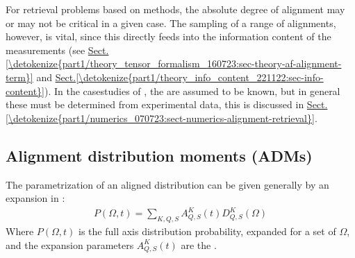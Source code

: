 \documentclass[letterpaper,table,10pt,english]{jupyterBook}
\begin{document}
\sphinxAtStartPar
For {\hyperref[\detokenize{backmatter/glossary:term-radial-matrix-elements}]{}} retrieval problems based on {\hyperref[\detokenize{backmatter/glossary:term-RWP}]{}} methods, the absolute degree of alignment may \sphinxhyphen{} or may not \sphinxhyphen{} be critical in a given case. The sampling of a range of  alignments, however, is vital, since this directly feeds into the information content of the measurements (see \hyperref[\detokenize{part1/theory_tensor_formalism_160723:sec-theory-af-alignment-term}]{Sect.\@ \ref{\detokenize{part1/theory_tensor_formalism_160723:sec-theory-af-alignment-term}}} and \hyperref[\detokenize{part1/theory_info_content_221122:sec-info-content}]{Sect.\@ \ref{\detokenize{part1/theory_info_content_221122:sec-info-content}}}). In the case\sphinxhyphen{}studies of {\hyperref[\detokenize{part2/extracting_matrix_elements_overview_270423:chpt-extracting-matrix-elements-overview}]{}}, the {\hyperref[\detokenize{backmatter/glossary:term-ADMs}]{}} are assumed to be known, but in general these must be determined from experimental data, this is discussed in \hyperref[\detokenize{part1/numerics_070723:sect-numerics-alignment-retrieval}]{Sect.\@ \ref{\detokenize{part1/numerics_070723:sect-numerics-alignment-retrieval}}}.


\subsection{Alignment distribution moments (ADMs)}
\label{\detokenize{part1/theory_molecular_alignment_170723:alignment-distribution-moments-adms}}
\sphinxAtStartPar
The parametrization of an aligned distribution can be given generally by an expansion in {\hyperref[\detokenize{backmatter/glossary:term-Wigner-rotation-matrix-elements}]{}}:
\begin{equation}\label{equation:part1/theory_molecular_alignment_170723:eqn:P-omega-t}
\begin{split} 
P(\Omega,t) = \sum_{K,Q,S} A^K_{Q,S}(t)D^K_{Q,S}(\Omega)
\end{split}
\end{equation}
\sphinxAtStartPar
Where \(P(\Omega,t)\) is the full axis distribution probability, expanded for a set of {\hyperref[\detokenize{backmatter/glossary:term-Euler-angles}]{}} \(\Omega\), and the expansion parameters \(A^K_{Q,S}(t)\) are the {\hyperref[\detokenize{backmatter/glossary:term-ADMs}]{}}.
\end{document}
